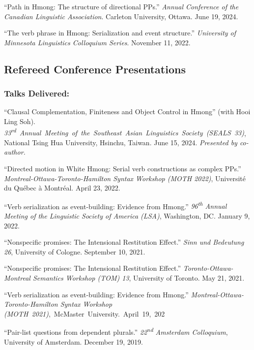 \documentclass[11pt,oneside,DIV=calc,parskip=off]{scrarticle} %
\newlength{\spacingbefore}
\newlength{\spacingafter}
\newcommand{\myonecol}[1]{%
	\vspace{\spacingbefore}%
	\begin{minipage}[t]{\linewidth}%
		\strut#1%
	\end{minipage}%
	\vspace{\spacingafter}\par%
	}
\newcommand{\talk}[1]{%
	\myonecol{#1}%
	}
\begin{document}
\talk{``Path in Hmong: The structure of directional PPs.'' \textit{Annual Conference of the Canadian Linguistic Association}. Carleton University, Ottawa. June 19, 2024.}

\talk{``The verb phrase in Hmong: Serialization and event structure.'' \textit{University of Minnesota Linguistics Colloquium Series}. November 11, 2022.}


\subsection{Refereed Conference Presentations}
\subsubsection{Talks Delivered:}
\talk{``Clausal Complementation, Finiteness and Object Control in Hmong'' (with Hooi Ling Soh). \mbox{\textit{33\textsuperscript{rd} Annual Meeting of the Southeast Asian Linguistics Society (SEALS 33)},} National Tsing Hua University, Hsinchu, Taiwan. June 15, 2024. \emph{Presented by co-author.}} 
\talk{``Directed motion in White Hmong: Serial verb constructions as complex PPs.'' \textit{Montreal-Ottawa-Toronto-Hamilton Syntax Workshop (MOTH 2022)}, Universit\'e du Qu\'ebec \`a Montr\'eal. April 23, 2022.}
\talk{``Verb serialization as event-building: Evidence from Hmong.'' \textit{96\textsuperscript{th} Annual Meeting of the Linguistic Society of America (LSA)}, Washington, DC. January 9, 2022.}
\talk{``Nonspecific promises: The Intensional Restitution Effect.'' \textit{Sinn und Bedeutung 26}, University of Cologne. September 10, 2021.}
\talk{``Nonspecific promises: The Intensional Restitution Effect.'' \textit{Toronto-Ottawa-Montreal Semantics Workshop (TOM) 13}, University of Toronto. May 21, 2021.}
\talk{``Verb serialization as event-building: Evidence from Hmong.'' \textit{Montreal-Ottawa-Toronto-Hamilton Syntax Workshop} \mbox{\textit{(MOTH 2021)}, McMaster University. April 19, 202\rlap{1.}}}
\talk{``Pair-list questions from dependent plurals.'' \textit{22\textsuperscript{nd} Amsterdam Colloquium}, University of Amsterdam. December 19, 2019.}
\end{document}
